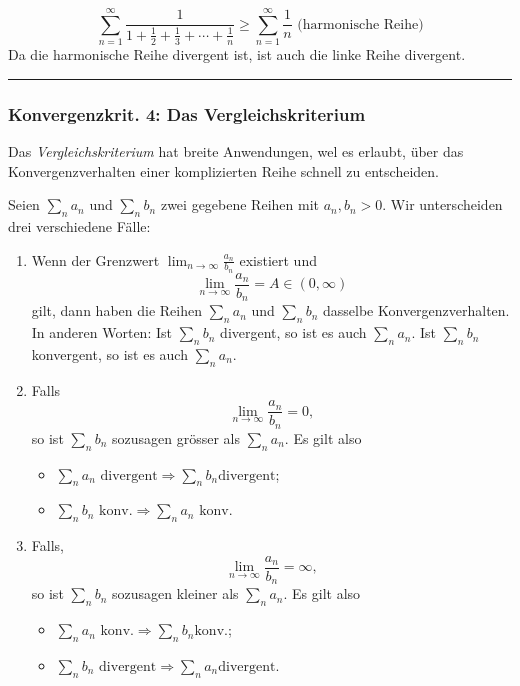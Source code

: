 \documentclass[a4paper,landscape,8pt]{extarticle}
\newcommand{\sep}{\vspace{5pt}\noindent\hrule\vspace{5pt}}
\begin{document}
\begin{multicols*}{4}
\begin{warmup}
\Bsp
\[
\sum_{n=1}^\infty \frac{1}{1+\tfrac{1}{2} + \tfrac{1}{3} + \cdots +
\tfrac{1}{n}}\geq
\sum_{n=1}^\infty \frac{1}{n} \text{ (harmonische  Reihe)} 
\]
Da die harmonische Reihe divergent ist, ist auch die linke Reihe divergent.
\end{warmup}

\sep

\subsubsection{Konvergenzkrit. 4: Das Vergleichskriterium}

Das \emph{Vergleichskriterium} hat breite Anwendungen, wel es erlaubt, über das
Konvergenzverhalten einer komplizierten Reihe schnell zu entscheiden.

Seien $\sum_n a_n$ und $\sum_n b_n$ zwei gegebene Reihen mit $a_n,b_n>0$.
Wir unterscheiden drei verschiedene Fälle:

\begin{enumerate}
  \item Wenn der Grenzwert
$\lim_{n\to\infty}\frac{a_n}{b_n}$ existiert und
\[
\lim_{n\to\infty}\frac{a_n}{b_n}=A\in (0,\infty)
\]
gilt, dann haben die Reihen $\sum_n a_n$ und $\sum_n b_n$ dasselbe
Konvergenzverhalten. In anderen Worten: Ist $\sum_n b_n$ divergent, so ist es
auch $\sum_n a_n$. Ist $\sum_n b_n$ konvergent, so ist es auch $\sum_n a_n$.

\item Falls
\[
\lim_{n\to\infty} \frac{a_n}{b_n} = 0,
\]
so ist $\sum_n b_n$ sozusagen grösser als $\sum_n a_n$. Es gilt also
\begin{itemize}
  \item $\sum_n a_n \text{ divergent} \Longrightarrow \sum_n b_n \text{
  divergent}$;
  \item $\sum_n b_n \text{ konv.} 
  \Longrightarrow \sum_n a_n \text{ konv.}$
\end{itemize}
\item Falls,
\[
\lim_{n\to\infty}\frac{a_n}{b_n} = \infty,
\]
so ist $\sum_n b_n$ sozusagen kleiner als $\sum_n a_n$. Es gilt also
\begin{itemize}
  \item $\sum_n a_n \text{ konv.}\Longrightarrow \sum_n b_n \text{
  konv.}$;
  \item $\sum_n b_n \text{ divergent} \Longrightarrow \sum_n a_n \text{
  divergent}$.
\end{itemize}
\end{enumerate}



\end{multicols*}
\end{document}
